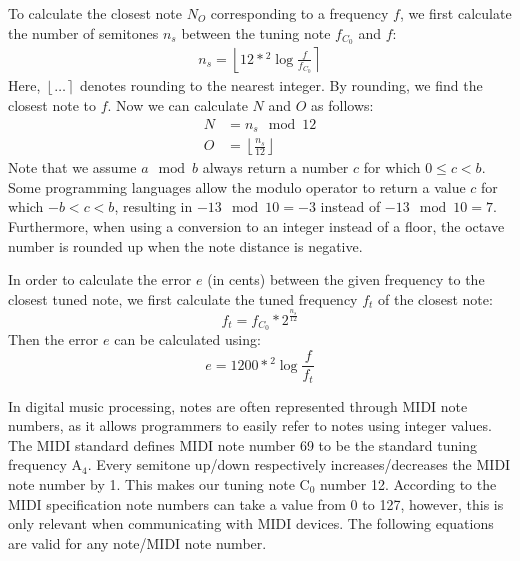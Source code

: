 \documentclass[10pt,twocolumn]{article}
\newcommand{\note}[2]{#1${}_{#2}$}
\newcommand{\floor}[1]{\left \lfloor #1 \right \rfloor}
\newcommand{\round}[1]{\left \lfloor #1 \right \rceil}
\begin{document}
To calculate the closest note $N_O$ corresponding to a frequency $f$, we first calculate the number of semitones $n_s$ between the tuning note $f_{C_0}$ and $f$:
\begin{align*}
    n_s = \round{12 * {}^{2}\!\log{\frac{f}{f_{C_0}}}}
\end{align*}
Here, $\round{\ldots}$ denotes rounding to the nearest integer. By rounding, we find the closest note to $f$. Now we can calculate $N$ and $O$ as follows:
\begin{align*}
    N &= n_s \mod 12 \\
    O &= \floor{\frac{n_s}{12}}
\end{align*}
Note that we assume $a \mod b$ always return a number $c$ for which $0 \leq c < b$. Some programming languages allow the modulo operator to return a value $c$ for which $-b < c < b$, resulting in $-13 \mod 10 = -3$ instead of $-13 \mod 10 = 7$. Furthermore, when using a conversion to an integer instead of a floor, the octave number is rounded up when the note distance is negative.

In order to calculate the error $e$ (in cents) between the given frequency to the closest tuned note, we first calculate the tuned frequency $f_t$ of the closest note:
\[ f_t = f_{C_0} * 2^{\frac{n_s}{12}} \]
Then the error $e$ can be calculated using:
\[ e = 1200 * {}^{2}\!\log{\frac{f}{f_t}} \]

In digital music processing, notes are often represented through MIDI note numbers, as it allows programmers to easily refer to notes using integer values. The MIDI standard defines MIDI note number 69 to be the standard tuning frequency \note{A}{4}. Every semitone up/down respectively increases/decreases the MIDI note number by 1. This makes our tuning note \note{C}{0} number 12. According to the MIDI specification note numbers can take a value from 0 to 127, however, this is only relevant when communicating with MIDI devices. The following equations are valid for any note/MIDI note number.
\end{document}
